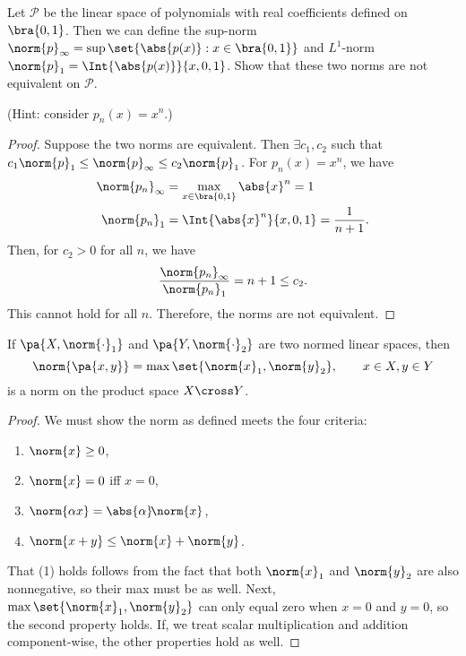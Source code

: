 \documentclass[10pt,letterpaper,twoside]{hmcpset}
\begin{document}
\begin{problem}[4]
 Let $\mathcal{P}$ be the linear space of polynomials with real coefficients defined on $\bra{0,1}$.  Then we can define the sup-norm $\norm{p}_\infty = \sup\set{\abs{p(x)} : x \in \bra{0,1}}$ and $L^1$-norm $\norm{p}_1 = \Int{\abs{p(x)}}{x,0,1}$.  Show that these two norms are not equivalent on $\mathcal{P}$.
 
 (Hint: consider $p_n(x) = x^n$.)
\end{problem}

\begin{solution}
\begin{proof}
  Suppose the two norms are equivalent. Then $\exists c_1, c_2$ such that $c_1\norm{p}_1 \leq \norm{p}_\infty \leq c_2\norm{p}_1$. For $p_n(x) = x^n$, we have 
 \begin{align*}
  \norm{p_n}_\infty &= \max_{x\in\bra{0,1}} \abs{x}^n = 1 \\
  \norm{p_n}_1 &= \Int{\abs{x}^n}{x,0,1} = \frac{1}{n+1}.
 \end{align*}
Then, for $c_2 > 0$ for all $n$, we have 
\[\frac{\norm{p_n}_\infty}{\norm{p_n}_1} = n + 1 \leq c_2. \]
This cannot hold for all $n$.  Therefore, the norms are not equivalent.
\end{proof}

\end{solution}


\begin{problem}[5]
 If $\pa{X, \norm{\cdot}_1}$ and $\pa{Y,\norm{\cdot}_2}$ are two normed linear spaces, then \[\norm{\pa{x,y}} = \max\set{\norm{x}_1,\norm{y}_2}, \qquad x\in X, y\in Y\] is a norm on the product space $X \cross Y$.
\end{problem}

\begin{solution}
\begin{proof}
  We must show the norm as defined meets the four criteria:
 \begin{enumerate}
  \item $\norm{x} \geq 0$,
  \item $\norm{x} = 0$ iff $x = 0$,
  \item $\norm{\alpha x} = \abs{\alpha}\!\norm{x}$,
  \item $\norm{x + y} \leq \norm{x} + \norm{y}$.
 \end{enumerate}

 That (1) holds follows from the fact that both $\norm{x}_1$ and $\norm{y}_2$ are also nonnegative, so their max must be as well.  Next, $\max\set{\norm{x}_1,\norm{y}_2}$ can only equal zero when $x = 0$ and $y=0$, so the second property holds.  If, we treat scalar multiplication and addition component-wise, the other properties hold as well.
\end{proof}

\end{solution}
\end{document}
